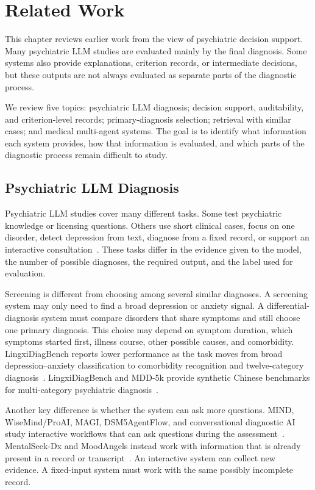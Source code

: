 \chapter{Related Work}
\label{ch:related}

This chapter reviews earlier work from the view of psychiatric decision support. Many psychiatric LLM studies are evaluated mainly by the final diagnosis. Some systems also provide explanations, criterion records, or intermediate decisions, but these outputs are not always evaluated as separate parts of the diagnostic process.

We review five topics: psychiatric LLM diagnosis; decision support, auditability, and criterion-level records; primary-diagnosis selection; retrieval with similar cases; and medical multi-agent systems. The goal is to identify what information each system provides, how that information is evaluated, and which parts of the diagnostic process remain difficult to study.

\section{Psychiatric LLM Diagnosis}

Psychiatric LLM studies cover many different tasks. Some test psychiatric knowledge or licensing questions. Others use short clinical cases, focus on one disorder, detect depression from text, diagnose from a fixed record, or support an interactive consultation~\citep{qiu2023largeai,li2024taiwan,raballo2025,sarma2025,li2025addreview,mcduff2025amie}. These tasks differ in the evidence given to the model, the number of possible diagnoses, the required output, and the label used for evaluation.

Screening is different from choosing among several similar diagnoses. A screening system may only need to find a broad depression or anxiety signal. A differential-diagnosis system must compare disorders that share symptoms and still choose one primary diagnosis. This choice may depend on symptom duration, which symptoms started first, illness course, other possible causes, and comorbidity. LingxiDiagBench reports lower performance as the task moves from broad depression--anxiety classification to comorbidity recognition and twelve-category diagnosis~\citep{xu2026lingxidiagbench}. LingxiDiagBench and MDD-5k provide synthetic Chinese benchmarks for multi-category psychiatric diagnosis~\citep{xu2026lingxidiagbench,yin2024mdd5k}.

Another key difference is whether the system can ask more questions. MIND, WiseMind/ProAI, MAGI, DSM5AgentFlow, and conversational diagnostic AI study interactive workflows that can ask questions during the assessment~\citep{li2026mind,wu2026wisemind,bi2025magi,ozgun2025dsm5agentflow,tu2025conversational}. MentalSeek-Dx and MoodAngels instead work with information that is already present in a record or transcript~\citep{sun2026mentalseek,xiao2025moodangels}. An interactive system can collect new evidence. A fixed-input system must work with the same possibly incomplete record.

